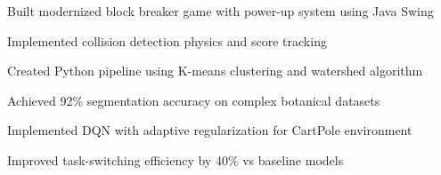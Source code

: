 \documentclass[]{deedy-resume-reversed}
\begin{document}
\begin{minipage}[t]{0.60\textwidth}
\begin{tightemize}
\item Built modernized block breaker game with power-up system using Java Swing
\item Implemented collision detection physics and score tracking
\end{tightemize}
\sectionsep

\begin{tightemize}
\item Created Python pipeline using K-means clustering and watershed algorithm
\item Achieved 92\% segmentation accuracy on complex botanical datasets
\end{tightemize}
\sectionsep

\begin{tightemize}
\item Implemented DQN with adaptive regularization for CartPole environment
\item Improved task-switching efficiency by 40\% vs baseline models
\end{tightemize}
\sectionsep






\end{minipage}
\end{document}
